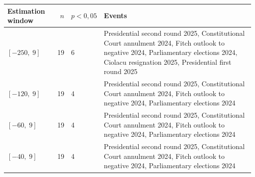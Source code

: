 {\footnotesize\setlength{\tabcolsep}{4pt}
\begin{tabular}{lrl p{9.6cm}}
\toprule
Estimation window & $n$ & $p<0{,}05$ & Events \\
\midrule
$[-250,\;9]$ & 19 & 6 & Presidential second round 2025, Constitutional Court annulment 2024, Fitch outlook to negative 2024, Parliamentary elections 2024, Ciolacu resignation 2025, Presidential first round 2025 \\
$[-120,\;9]$ & 19 & 4 & Presidential second round 2025, Constitutional Court annulment 2024, Fitch outlook to negative 2024, Parliamentary elections 2024 \\
$[-60,\;9]$ & 19 & 4 & Presidential second round 2025, Constitutional Court annulment 2024, Fitch outlook to negative 2024, Parliamentary elections 2024 \\
$[-40,\;9]$ & 19 & 4 & Presidential second round 2025, Constitutional Court annulment 2024, Fitch outlook to negative 2024, Parliamentary elections 2024 \\
\bottomrule
\end{tabular}}
